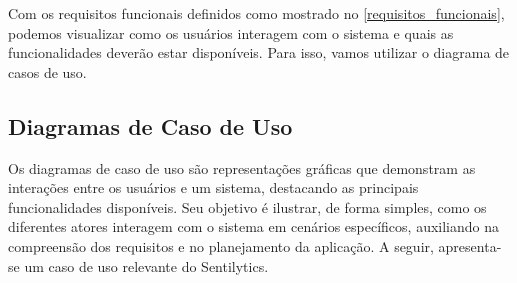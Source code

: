 \documentclass[
	12pt,				%
	oneside,			%
	a4paper,			%
	english,			%
	french,				%
	spanish,			%
	brazil				%
	]{abntex2}
\begin{document}
Com os requisitos funcionais definidos como mostrado no
\autoref{requisitos_funcionais}, podemos visualizar como os usuários
interagem com o sistema e quais as funcionalidades deverão estar
disponíveis. Para isso, vamos utilizar o diagrama de casos de uso.

\hypertarget{diagramas-de-caso-de-uso}{%
\subsection{Diagramas de Caso de Uso}\label{diagramas-de-caso-de-uso}}

Os diagramas de caso de uso são representações gráficas que demonstram
as interações entre os usuários e um sistema, destacando as principais
funcionalidades disponíveis. Seu objetivo é ilustrar, de forma simples,
como os diferentes atores interagem com o sistema em cenários
específicos, auxiliando na compreensão dos requisitos e no planejamento
da aplicação. A seguir, apresenta-se um caso de uso relevante do
Sentilytics.
\end{document}

